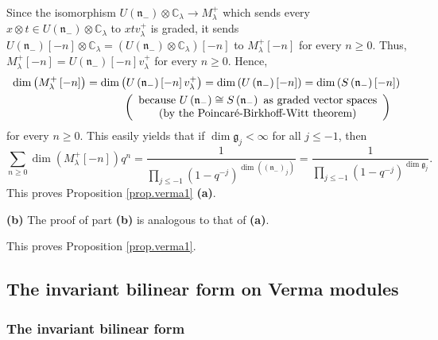 \documentclass
[numbers=enddot,12pt,final,onecolumn,german,notitlepage]{scrartcl}%
\theoremstyle{definition}
\begin{document}
Since the isomorphism $U\left(  \mathfrak{n}_{-}\right)  \otimes
\mathbb{C}_{\lambda}\rightarrow M_{\lambda}^{+}$ which sends every $x\otimes
t\in U\left(  \mathfrak{n}_{-}\right)  \otimes\mathbb{C}_{\lambda}$ to
$xtv_{\lambda}^{+}$ is graded, it sends $U\left(  \mathfrak{n}_{-}\right)
\left[  -n\right]  \otimes\mathbb{C}_{\lambda}=\left(  U\left(  \mathfrak{n}%
_{-}\right)  \otimes\mathbb{C}_{\lambda}\right)  \left[  -n\right]  $ to
$M_{\lambda}^{+}\left[  -n\right]  $ for every $n\geq0$. Thus, $M_{\lambda
}^{+}\left[  -n\right]  =U\left(  \mathfrak{n}_{-}\right)  \left[  -n\right]
v_{\lambda}^{+}$ for every $n\geq0$. Hence,
\begin{align*}
\dim\left(  M_{\lambda}^{+}\left[  -n\right]  \right)   &  =\dim\left(
U\left(  \mathfrak{n}_{-}\right)  \left[  -n\right]  v_{\lambda}^{+}\right)
=\dim\left(  U\left(  \mathfrak{n}_{-}\right)  \left[  -n\right]  \right)
=\dim\left(  S\left(  \mathfrak{n}_{-}\right)  \left[  -n\right]  \right) \\
&  \ \ \ \ \ \ \ \ \ \ \left(
\begin{array}
[c]{c}%
\text{because }U\left(  \mathfrak{n}_{-}\right)  \cong S\left(  \mathfrak{n}%
_{-}\right)  \text{ as graded vector spaces}\\
\text{(by the Poincar\'{e}-Birkhoff-Witt theorem)}%
\end{array}
\right)
\end{align*}
for every $n\geq0$. This easily yields that if $\dim\mathfrak{g}_{j}<\infty$
for all $j\leq-1$, then%
\[
\sum\limits_{n\geq0}\dim\left(  M_{\lambda}^{+}\left[  -n\right]  \right)
q^{n}=\dfrac{1}{\prod\limits_{j\leq-1}\left(  1-q^{-j}\right)  ^{\dim\left(
\left(  \mathfrak{n}_{-}\right)  _{j}\right)  }}=\dfrac{1}{\prod
\limits_{j\leq-1}\left(  1-q^{-j}\right)  ^{\dim\mathfrak{g}_{j}}}.
\]
This proves Proposition \ref{prop.verma1} \textbf{(a)}.

\textbf{(b)} The proof of part \textbf{(b)} is analogous to that of
\textbf{(a)}.

This proves Proposition \ref{prop.verma1}.

\subsection{\label{subsect.invform}The invariant bilinear form on Verma
modules}

\subsubsection{The invariant bilinear form}
\end{document}
